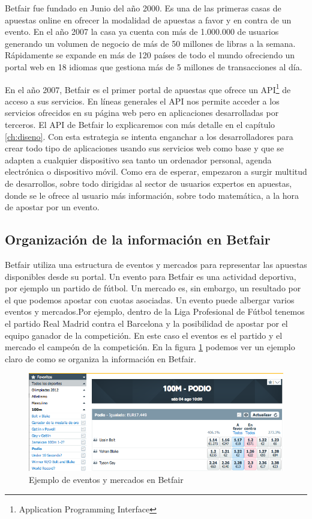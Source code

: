  Betfair fue fundado en Junio del año 2000. Es una de las primeras casas de apuestas online en ofrecer la modalidad de apuestas a favor y en contra de un evento. En el año 2007 la casa ya cuenta con más de 1.000.000 de usuarios generando un volumen de negocio de más de 50 millones de libras a la semana. Rápidamente se expande en más de 120 países de todo el mundo ofreciendo un portal web en 18 idiomas que gestiona más de 5 millones de transacciones al día. 

En el año 2007, Betfair es el primer portal de apuestas que ofrece un API\footnote{Application Programming Interface} de acceso a sus servicios. En líneas generales el API nos permite acceder a los servicios ofrecidos en su página web pero en aplicaciones desarrolladas por terceros. El API de Betfair lo explicaremos con más detalle en el capítulo \ref{ch:diseno}. Con esta estrategia se intenta enganchar a los desarrolladores para crear todo tipo de aplicaciones usando sus servicios web como base y que se adapten a cualquier dispositivo sea tanto un ordenador personal, agenda electrónica o dispositivo móvil. Como era de esperar, empezaron a surgir multitud de desarrollos, sobre todo dirigidas al sector de usuarios expertos en apuestas, donde se le ofrece al usuario más información, sobre todo matemática, a la hora de apostar por un evento.

\subsection{Organización de la información en Betfair}

 Betfair utiliza una estructura de eventos y mercados para representar las apuestas disponibles desde su portal. Un evento para Betfair es una actividad deportiva, por ejemplo un partido de fútbol. Un mercado es, sin embargo, un resultado por el que podemos apostar con cuotas asociadas. Un evento puede albergar varios eventos y mercados.Por ejemplo, dentro de la Liga Profesional de Fútbol tenemos el partido Real Madrid contra el Barcelona y la posibilidad de apostar por el equipo ganador de la competición. En este caso el eventos es el partido y el mercado el campeón de la competición. En la figura \ref{fig:eventoymercado} podemos ver un ejemplo claro de como se organiza la información en Betfair.
 
 \begin{figure} [h]
  \centering
    \includegraphics[width=0.95\linewidth]{./images/introbetfair.png} 
  \caption{Ejemplo de eventos y mercados en Betfair}
  \label{fig:eventoymercado}
\end{figure}

